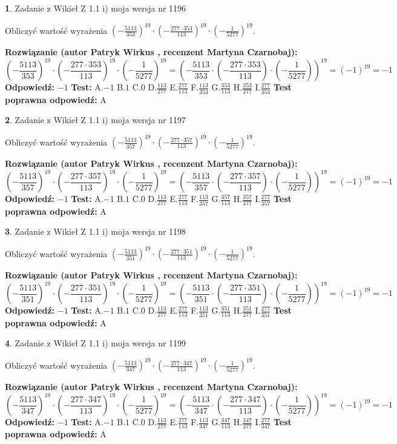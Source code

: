 \documentclass[12pt, a4paper]{article}
\theoremstyle{definition} %
\newtheorem{zad}{}
\newcommand{\zadStart}[1]{\begin{zad}#1\newline}
\newcommand{\zadStop}{\end{zad}}
\newcommand{\rozwStart}[2]{\noindent \textbf{Rozwiązanie (autor #1 , recenzent #2): }\newline}
\newcommand{\rozwStop}{\newline}
\newcommand{\odpStart}{\noindent \textbf{Odpowiedź:}\newline}
\newcommand{\odpStop}{\newline}
\newcommand{\testStart}{\noindent \textbf{Test:}\newline}
\newcommand{\testStop}{\newline}
\newcommand{\kluczStart}{\noindent \textbf{Test poprawna odpowiedź:}\newline}
\newcommand{\kluczStop}{\newline}
\begin{document}
\zadStart{Zadanie z Wikieł Z 1.1 i) moja wersja nr 1196}

Obliczyć wartość wyrażenia $(-\frac{5113}{353})^{19} \cdot (-\frac{277 \cdot 353}{113})^{19} \cdot (-\frac{1}{5277})^{19}$.
\zadStop
\rozwStart{Patryk Wirkus}{Martyna Czarnobaj}
$$(-\frac{5113}{353})^{19} \cdot (-\frac{277 \cdot 353}{113})^{19} \cdot (-\frac{1}{5277})^{19} = (-\frac{5113}{353} \cdot (-\frac{277 \cdot 353}{113}) \cdot (-\frac{1}{5277}))^{19} = (-1)^{19} = -1$$
\rozwStop
\odpStart
$-1$
\odpStop
\testStart
A.$-1$ B.$1$ C.$0$ D.$\frac{113}{277}$ E.$\frac{277}{113}$
F.$\frac{113}{353}$ G.$\frac{353}{113}$
H.$\frac{353}{277}$
I.$\frac{277}{353}$
\testStop
\kluczStart
A
\kluczStop



\zadStart{Zadanie z Wikieł Z 1.1 i) moja wersja nr 1197}

Obliczyć wartość wyrażenia $(-\frac{5113}{357})^{19} \cdot (-\frac{277 \cdot 357}{113})^{19} \cdot (-\frac{1}{5277})^{19}$.
\zadStop
\rozwStart{Patryk Wirkus}{Martyna Czarnobaj}
$$(-\frac{5113}{357})^{19} \cdot (-\frac{277 \cdot 357}{113})^{19} \cdot (-\frac{1}{5277})^{19} = (-\frac{5113}{357} \cdot (-\frac{277 \cdot 357}{113}) \cdot (-\frac{1}{5277}))^{19} = (-1)^{19} = -1$$
\rozwStop
\odpStart
$-1$
\odpStop
\testStart
A.$-1$ B.$1$ C.$0$ D.$\frac{113}{277}$ E.$\frac{277}{113}$
F.$\frac{113}{357}$ G.$\frac{357}{113}$
H.$\frac{357}{277}$
I.$\frac{277}{357}$
\testStop
\kluczStart
A
\kluczStop



\zadStart{Zadanie z Wikieł Z 1.1 i) moja wersja nr 1198}

Obliczyć wartość wyrażenia $(-\frac{5113}{351})^{19} \cdot (-\frac{277 \cdot 351}{113})^{19} \cdot (-\frac{1}{5277})^{19}$.
\zadStop
\rozwStart{Patryk Wirkus}{Martyna Czarnobaj}
$$(-\frac{5113}{351})^{19} \cdot (-\frac{277 \cdot 351}{113})^{19} \cdot (-\frac{1}{5277})^{19} = (-\frac{5113}{351} \cdot (-\frac{277 \cdot 351}{113}) \cdot (-\frac{1}{5277}))^{19} = (-1)^{19} = -1$$
\rozwStop
\odpStart
$-1$
\odpStop
\testStart
A.$-1$ B.$1$ C.$0$ D.$\frac{113}{277}$ E.$\frac{277}{113}$
F.$\frac{113}{351}$ G.$\frac{351}{113}$
H.$\frac{351}{277}$
I.$\frac{277}{351}$
\testStop
\kluczStart
A
\kluczStop



\zadStart{Zadanie z Wikieł Z 1.1 i) moja wersja nr 1199}

Obliczyć wartość wyrażenia $(-\frac{5113}{347})^{19} \cdot (-\frac{277 \cdot 347}{113})^{19} \cdot (-\frac{1}{5277})^{19}$.
\zadStop
\rozwStart{Patryk Wirkus}{Martyna Czarnobaj}
$$(-\frac{5113}{347})^{19} \cdot (-\frac{277 \cdot 347}{113})^{19} \cdot (-\frac{1}{5277})^{19} = (-\frac{5113}{347} \cdot (-\frac{277 \cdot 347}{113}) \cdot (-\frac{1}{5277}))^{19} = (-1)^{19} = -1$$
\rozwStop
\odpStart
$-1$
\odpStop
\testStart
A.$-1$ B.$1$ C.$0$ D.$\frac{113}{277}$ E.$\frac{277}{113}$
F.$\frac{113}{347}$ G.$\frac{347}{113}$
H.$\frac{347}{277}$
I.$\frac{277}{347}$
\testStop
\kluczStart
A
\kluczStop
\end{document}
